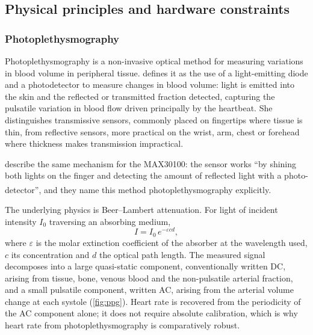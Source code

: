 \documentclass[12pt,a4paper,oneside]{report}
\newcommand{\bq}[1]{``#1''\textsuperscript{\dag}}
\begin{document}
\subsection{Physical principles and hardware constraints}\label{sec:hardware}

\subsubsection{Photoplethysmography}\label{sec:ppg}

Photoplethysmography is a non-invasive optical method for measuring variations in blood volume in peripheral tissue. \Textcite{navarro2023} defines it as the use of a light-emitting diode and a photodetector to measure changes in blood volume: light is emitted into the skin and the reflected or transmitted fraction detected, capturing the pulsatile variation in blood flow driven principally by the heartbeat. She distinguishes transmissive sensors, commonly placed on fingertips where tissue is thin, from reflective sensors, more practical on the wrist, arm, chest or forehead where thickness makes transmission impractical.

\Textcite{efendi2025} describe the same mechanism for the MAX30100: the sensor works \bq{by shining both lights on the finger and detecting the amount of reflected light with a photo-detector}, and they name this method photoplethysmography explicitly.

The underlying physics is Beer--Lambert attenuation. For light of incident intensity $I_0$ traversing an absorbing medium,
\begin{equation}
  I = I_0 \, e^{-\varepsilon c d},
\end{equation}
where $\varepsilon$ is the molar extinction coefficient of the absorber at the wavelength used, $c$ its concentration and $d$ the optical path length. The measured signal decomposes into a large quasi-static component, conventionally written DC, arising from tissue, bone, venous blood and the non-pulsatile arterial fraction, and a small pulsatile component, written AC, arising from the arterial volume change at each systole (\cref{fig:ppg}). Heart rate is recovered from the periodicity of the AC component alone; it does not require absolute calibration, which is why heart rate from photoplethysmography is comparatively robust.
\end{document}
